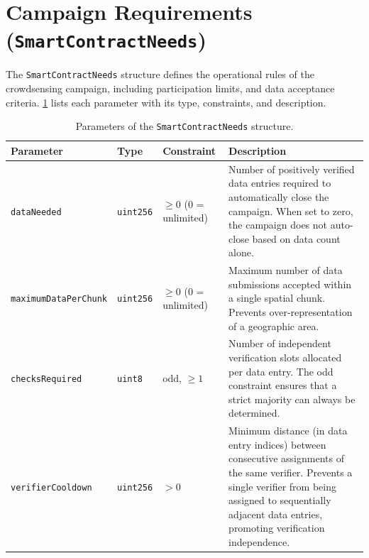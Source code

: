 \section{Campaign Requirements (\texttt{SmartContractNeeds})}\label{sec:appendix-a-needs}
The \texttt{SmartContractNeeds} structure defines the operational rules of the crowdsensing campaign, including participation limits, and data acceptance criteria.
\ref{tab:params-needs} lists each parameter with its type, constraints, and description.
\begin{table}
    \centering
    \caption{Parameters of the \texttt{SmartContractNeeds} structure.}
    \label{tab:params-needs}
    \small
    \begin{tabular}{p{3.8cm} l p{1.8cm} p{5.8cm}}
        \hline
        \textbf{Parameter} & \textbf{Type} & \textbf{Constraint} & \textbf{Description} \\
        \hline
        \texttt{dataNeeded}
        & \texttt{uint256}
        & $\geq 0$ (0 = unlimited)
        & Number of positively verified data entries required to automatically close the campaign.
        When set to zero, the campaign does not auto-close based on data count alone. \\[6pt]

        \texttt{maximumDataPerChunk}
        & \texttt{uint256}
        & $\geq 0$ (0 = unlimited)
        & Maximum number of data submissions accepted within a single spatial chunk.
        Prevents over-representation of a geographic area. \\[6pt]

        \texttt{checksRequired}
        & \texttt{uint8}
        & odd, $\geq 1$
        & Number of independent verification slots allocated per data entry.
        The odd constraint ensures that a strict majority can always be determined. \\[6pt]

        \texttt{verifierCooldown}
        & \texttt{uint256}
        & $> 0$
        & Minimum distance (in data entry indices) between consecutive assignments of the same verifier.
        Prevents a single verifier from being assigned to sequentially adjacent data entries, promoting verification independence. \\[6pt]


\end{tabular}
\end{table}

